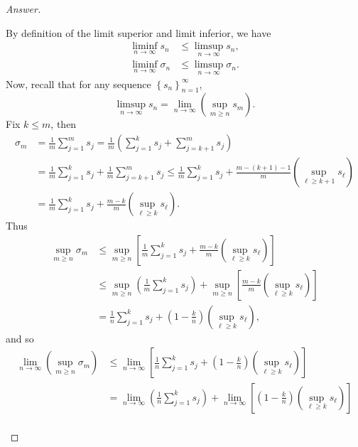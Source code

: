 \documentclass[12pt]{article}
\newcommand\paren[1]{\left( #1 \right)}
\newcommand\setb[1]{\left \{ #1 \right \}}
\newcommand{\sqbrack}[1]{\left [ #1 \right ]}
\theoremstyle{definition}
\begin{document}
\begin{proof}[Answer]
\begin{enumerate}[(a)]
        By definition of the limit superior and limit inferior, we have
        \begin{align*}
            \liminf\limits_{n \to \infty} s_n & \leq \limsup\limits_{n \to \infty} s_n , \\
            \liminf\limits_{n \to \infty} \sigma_n & \leq \limsup\limits_{n \to \infty} \sigma_n .
        \end{align*}
        Now, recall that for any sequence $\setb{ s_n }_{n = 1}^{\infty}$,
        \[
            \limsup\limits_{n \to \infty} s_n = \lim\limits_{n \to \infty} \paren{ \sup\limits_{m \geq n} s_m }.
        \]
        Fix $k \leq m$, then 
        \begin{align*}
            \sigma_m & = \frac{1}{m} \sum\limits_{j = 1}^m s_j = \frac{1}{m} \paren{ \sum\limits_{j = 1}^k s_j + \sum\limits_{j = k + 1}^m s_j } \\
            & = \frac{1}{m} \sum\limits_{j = 1}^k s_j + \frac{1}{m} \sum\limits_{j = k + 1}^m s_j \leq \frac{1}{m} \sum\limits_{j = 1}^k s_j + \frac{m - (k+1) - 1}{m} \paren{ \sup\limits_{\ell \geq k + 1} s_{\ell} } \\
            & = \frac{1}{m} \sum\limits_{j = 1}^k s_j + \frac{m - k}{m} \paren{ \sup\limits_{\ell \geq k} s_{\ell} }.
        \end{align*}
        Thus 
        \begin{align*}
            \sup\limits_{m \geq n} \sigma_m & \leq \sup\limits_{m \geq n} \sqbrack{ \frac{1}{m} \sum\limits_{j = 1}^k s_j + \frac{m - k}{m} \paren{ \sup\limits_{\ell \geq k} s_{\ell} } } \\
            & \leq \sup\limits_{m \geq n} \paren{ \frac{1}{m} \sum\limits_{j = 1}^k s_j } + \sup\limits_{m \geq n} \sqbrack{ \frac{m - k}{m} \paren{ \sup\limits_{\ell \geq k} s_{\ell} } } \\
            & = \frac{1}{n} \sum\limits_{j = 1}^k s_j + \paren{ 1 - \frac{k}{n} } \paren{ \sup\limits_{\ell \geq k} s_{\ell} },
        \end{align*}
        and so 
        \begin{align*}
            \lim\limits_{n \to \infty} \paren{ \sup\limits_{m \geq n} \sigma_m } & \leq \lim\limits_{n \to \infty} \sqbrack{ \frac{1}{n} \sum\limits_{j = 1}^k s_j + \paren{ 1 - \frac{k}{n} } \paren{ \sup\limits_{\ell \geq k} s_{\ell} } } \\
            & = \lim\limits_{n \to \infty} \paren{ \frac{1}{n} \sum\limits_{j = 1}^k s_j } + \lim\limits_{n \to \infty} \sqbrack{ \paren{ 1 - \frac{k}{n} } \paren{ \sup\limits_{\ell \geq k} s_{\ell} } } \\

\end{align*}
\end{enumerate}
\end{proof}
\end{document}
